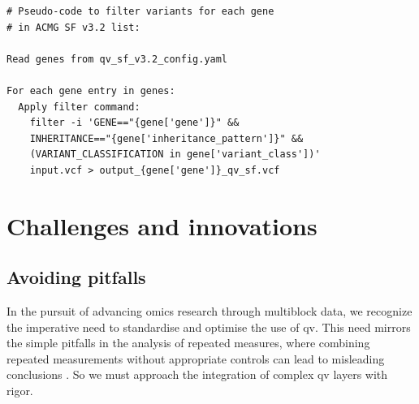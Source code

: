 \begin{tcolorbox}[
    breakable,  %
    colback=white!0,  %
    colframe=black,  %
    boxrule=1pt,  %
    arc=1mm,  %
    outer arc=1mm,
    title=\textbf{\refstepcounter{myboxcounter}\label{box:qv_variables_example_sf2}Box \themyboxcounter: Filtering command for QV SF}
]
\begin{verbatim}
# Pseudo-code to filter variants for each gene 
# in ACMG SF v3.2 list:

Read genes from qv_sf_v3.2_config.yaml

For each gene entry in genes:
  Apply filter command:
    filter -i 'GENE=="{gene['gene']}" && 
    INHERITANCE=="{gene['inheritance_pattern']}" && 
    (VARIANT_CLASSIFICATION in gene['variant_class'])' 
    input.vcf > output_{gene['gene']}_qv_sf.vcf
\end{verbatim}
\end{tcolorbox}

\section{Challenges and innovations}
\subsection{Avoiding pitfalls}
In the pursuit of advancing omics research through multiblock data, we recognize the imperative need to standardise and optimise the use of \ac{qv}. 
This need mirrors the simple pitfalls in the analysis of repeated measures, where combining repeated measurements without appropriate controls can lead to misleading conclusions
\cite{bland1994correlation}.
So we must approach the integration of complex \ac{qv} layers with rigor.

